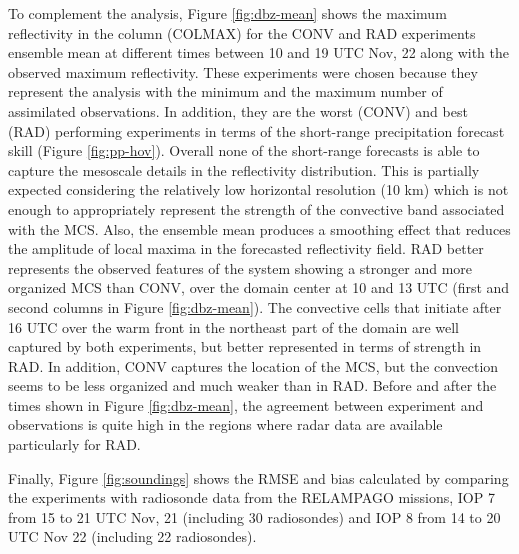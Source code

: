 \documentclass[final,5p,times,twocolumn,authoryear]{elsarticle} %
\begin{document}
To complement the analysis, Figure \ref{fig:dbz-mean} shows the maximum reflectivity in the column (COLMAX) for the CONV and RAD experiments ensemble mean at different times between 10 and 19 UTC Nov, 22 along with the observed maximum reflectivity. These experiments were chosen because they represent the analysis with the minimum and the maximum number of assimilated observations. In addition, they are the worst (CONV) and best (RAD) performing experiments in terms of the short-range precipitation forecast skill (Figure \ref{fig:pp-hov}). Overall none of the short-range forecasts is able to capture the mesoscale details in the reflectivity distribution. This is partially expected considering the relatively low horizontal resolution (10 km) which is not enough to appropriately represent the strength of the convective band associated with the MCS. Also, the ensemble mean produces a smoothing effect that reduces the amplitude of local maxima in the forecasted reflectivity field. RAD better represents the observed features of the system showing a stronger and more organized MCS than CONV, over the domain center at 10 and 13 UTC (first and second columns in Figure \ref{fig:dbz-mean}). The convective cells that initiate after 16 UTC over the warm front in the northeast part of the domain are well captured by both experiments, but better represented in terms of strength in RAD. In addition, CONV captures the location of the MCS, but the convection seems to be less organized and much weaker than in RAD. Before and after the times shown in Figure \ref{fig:dbz-mean}, the agreement between experiment and observations is quite high in the regions where radar data are available particularly for RAD.

Finally, Figure \ref{fig:soundings} shows the RMSE and bias calculated by comparing the experiments with radiosonde data from the RELAMPAGO missions, IOP 7 from 15 to 21 UTC Nov, 21 (including 30 radiosondes) and IOP 8 from 14 to 20 UTC Nov 22 (including 22 radiosondes).
\end{document}
